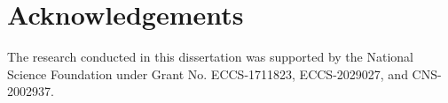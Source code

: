 \chapter*{Acknowledgements}

The research conducted in this dissertation was supported by the  National Science Foundation under Grant No. ECCS-1711823, ECCS-2029027, and CNS-2002937.

